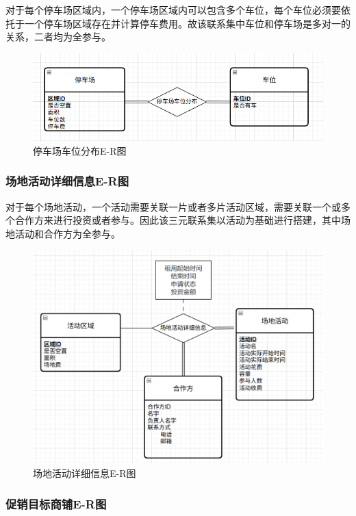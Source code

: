 \documentclass[]{article}
\let\oldincludegraphics\includegraphics
\renewcommand{\includegraphics}[2][]{%
  \begin{center}\oldincludegraphics[#1]{#2}\end{center}%
}
\begin{document}
对于每个停车场区域内，一个停车场区域内可以包含多个车位，每个车位必须要依托于一个停车场区域存在并计算停车费用。故该联系集中车位和停车场是多对一的关系，二者均为全参与。

\begin{figure}[htbp]
\centering
\includegraphics{image4.png}
\caption{停车场车位分布E-R图}
\end{figure}

\hypertarget{ux573aux5730ux6d3bux52a8ux8be6ux7ec6ux4fe1ux606fe-rux56fe}{%
\subsubsection{场地活动详细信息E-R图}\label{ux573aux5730ux6d3bux52a8ux8be6ux7ec6ux4fe1ux606fe-rux56fe}}

对于每个场地活动，一个活动需要关联一片或者多片活动区域，需要关联一个或多个合作方来进行投资或者参与。因此该三元联系集以活动为基础进行搭建，其中场地活动和合作方为全参与。

\begin{figure}[htbp]
\centering
\includegraphics{image5.png}
\caption{场地活动详细信息E-R图}
\end{figure}

\hypertarget{ux4fc3ux9500ux76eeux6807ux5546ux94fae-rux56fe}{%
\subsubsection{促销目标商铺E-R图}\label{ux4fc3ux9500ux76eeux6807ux5546ux94fae-rux56fe}}
\end{document}
